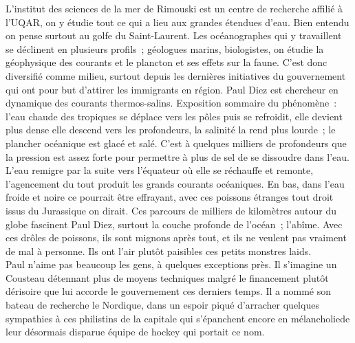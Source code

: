 \documentclass{article}
\begin{document}
L’institut des sciences de la mer de Rimouski est un centre de recherche
affilié à l’UQAR, on y étudie tout ce qui a lieu aux grandes étendues d’eau.
Bien entendu on pense surtout au golfe du Saint-Laurent. Les océanographes qui
y travaillent se déclinent en plusieurs profils ; géologues marins,
biologistes, on étudie la géophysique des courants et le plancton et ses effets
sur la faune.  C’est donc diversifié comme milieu, surtout depuis les dernières
initiatives du gouvernement qui ont pour but d’attirer les immigrants en
région. Paul Diez est chercheur en dynamique des courants thermos-salins.
Exposition sommaire du phénomène : l’eau chaude des tropiques se déplace vers
les pôles puis se refroidit, elle devient plus dense elle descend vers les
profondeurs, la salinité la rend plus lourde ; le plancher océanique est glacé
et salé. C’est à quelques milliers de profondeurs que la pression est assez
forte pour permettre à plus de sel de se dissoudre dans l’eau.\\

L’eau remigre par la suite vers l’équateur où elle se réchauffe et remonte,
l’agencement du tout produit les grands courants océaniques. En bas, dans l’eau
froide et noire ce pourrait être effrayant, avec ces poissons étranges tout
droit issus du Jurassique on dirait. Ces parcours de milliers de kilomètres
autour du globe fascinent Paul Diez, surtout la couche profonde de l’océan ;
l’abîme. Avec ces drôles de poissons, ils sont mignons après tout, et ils ne
veulent pas vraiment de mal à personne. Ils ont l’air plutôt paisibles ces
petits monstres laids.\\

Paul n'aime pas beaucoup les gens, à quelques exceptions près. Il s'imagine un
Cousteau détennant plus de moyens techniques malgré le financement plutôt
dérisoire que lui accorde le gouvernement ces derniers temps. Il a nommé son
bateau de recherche le Nordique, dans un espoir piqué d'arracher quelques
sympathies à ces philistins de la capitale qui s'épanchent encore en
mélancholiede leur désormais disparue équipe de hockey qui portait ce nom.
\end{document}
